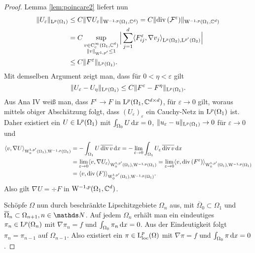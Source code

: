 \begin{proof}
  Lemma \ref{lem:poincare2} liefert nun
  \begin{align*}
  \| U_\varepsilon\|_{\mathrm{L}^p(\Omega_1)} 
  &\leq C \|\nabla U_\varepsilon\|_{\mathrm{W}^{-1,p}(\Omega_1, \mathbb{C}^d)} 
    = C \| \mathrm{div\,} (\mathcal{F}^\varepsilon)\|_{\mathrm{W}^{-1,p}(\Omega_1,\mathbb{C}^d)} \\
    &= C \sup_{\substack{v \in \mathrm{C}_{\mathrm{c}}^\infty(\Omega_1, \mathbb{C}^d) \\ \|v\|_{\mathrm{W}^{1,p'}} \leq 1}} \Big| \sum_{j = 1}^d \langle F_{ij}^\varepsilon, \nabla v_j \rangle_{\mathrm{L}^p(\Omega_2), \mathrm{L}^{p'}(\Omega_2)} \Big| \\
    &\leq C \|F^\varepsilon\|_{\mathrm{L}^p(\Omega_1)}.
  \end{align*}
  Mit demselben Argument zeigt man, dass für $0< \eta < \varepsilon$ gilt
  $$
  \|U_\varepsilon - U_\eta \|_{\mathrm{L}^p(\Omega_1)} \leq C \| F^\varepsilon - F^\eta\|_{\mathrm{L}^p(\Omega_1)}.
  $$
  Aus Ana IV weiß man, dass $F^\varepsilon \to F$ in $\mathrm{L}^p(\Omega_1, \mathbb{C}^{d\times d})$, für $\varepsilon \to 0$ gilt, woraus mittels obiger Abschätzung folgt, dass $(U_\varepsilon)_\varepsilon$ ein Cauchy-Netz in $\mathrm{L}^p(\Omega_1)$ ist.
  Daher existiert ein $U \in \mathrm{L}^p(\Omega_1)$ mit $\int_{\Omega_0} U \, {\operatorname{d}\!{x}} = 0$, $\|u_\varepsilon - u\|_{\mathrm{L}^p(\Omega_1)} \to 0$ für $\varepsilon \to 0$ und
  \begin{align*}
    \langle v, \nabla U \rangle_{\mathrm{W}_0^{1,p'}(\Omega_1), \mathrm{W}^{-1,p}(\Omega_1)}
    &= - \int_{\Omega_1} U \, \overline{\mathrm{div\,} v } \, {\operatorname{d}\!{x}}
    = - \lim_{\varepsilon \to 0} \int_{\Omega_1} U_\varepsilon \, \overline{\mathrm{div\,} v} \, {\operatorname{d}\!{x}} \\
    &= \lim_{\varepsilon \to 0} \langle v, \nabla U_\varepsilon \rangle_{\mathrm{W}_0^{1,p'}(\Omega_1), \mathrm{W}^{-1, p}(\Omega_1)}
    = \lim_{\varepsilon \to 0} \langle v, \mathrm{div\,} (F^\varepsilon) \rangle_{\mathrm{W}_0^{1,p'}(\Omega_1), \mathrm{W}^{-1, p}(\Omega_1)} \\
     &= \langle v, \mathrm{div\,} (F) \rangle_{\mathrm{W}_0^{1,p'}(\Omega_1), \mathrm{W}^{-1, p}(\Omega_1)}.
  \end{align*}
  Also gilt $\nabla U = \div F$ in $\mathrm{W}^{-1,p}(\Omega_1, \mathbb{C}^d)$.
  
  Schöpfe $\Omega$ nun durch beschränkte Lipschitzgebiete $\Omega_n$ aus, mit $\overline\Omega_0 \subset \Omega_1$ und $\overline\Omega_n \subset \Omega_{n + 1}, n \in \N$.
  Auf jedem $\Omega_n$ erhält man ein eindeutiges $\pi_n \in \mathrm{L}^p(\Omega_n)$ mit $\nabla \pi_n = f$ und $\int_{\Omega_0} \pi_n \, {\operatorname{d}\!{x}} = 0$.
  Aus der Eindeutigkeit folgt $\pi_n = \pi_{n -1}$ auf $\Omega_{n - 1}$.
  Also existiert ein $\pi \in \mathrm{L}^p_{\operatorname{loc}}(\Omega)$ mit $\nabla\pi = f$ und $\int_{\Omega_0} \pi \, {\operatorname{d}\!{x}} = 0$.
\end{proof}

